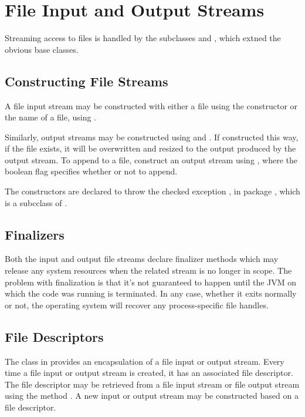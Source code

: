 \section{File Input and Output Streams}

Streaming access to files is handled by the subclasses
 and , which
extned the obvious base classes.  

\subsection{Constructing File Streams}

A file input stream may be constructed with either a file using the
constructor  or the name of a file, using
.  

Similarly, output streams may be constructed using
 and .
If constructed this way, if the file exists, it will be overwritten
and resized to the output produced by the output stream.  To append
to a file, construct an output stream using
, where the boolean flag
specifies whether or not to append.

The constructors are declared to throw the checked exception
, in package , which is a
subcclass of .  

\subsection{Finalizers}

Both the input and output file streams declare finalizer methods which
may release any system resources when the related stream is no longer
in scope.  The problem with finalization is that it's not guaranteed
to happen until the JVM on which the code was running is terminated.
In any case, whether it exits normally or not, the operating system
will recover any process-specific file handles.



\subsection{File Descriptors}\label{section:io-file-descriptors}

The  class in  provides an
encapsulation of a file input or output stream.  Every time a file
input or output stream is created, it has an associated file
descriptor.  The file descriptor may be retrieved from a file input
stream or file output stream using the method .  A new
input or output stream may be constructed based on a file descriptor.

